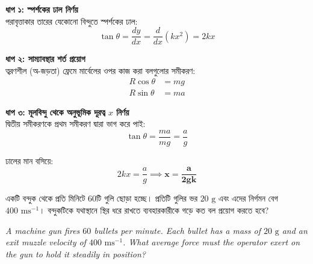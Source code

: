 \documentclass[12pt, a4paper]{article}
\begin{document}
\begin{tcolorbox}[solutionbox={সমাধান (Solution)}]
\noindent
\textbf{ধাপ ১: স্পর্শকের ঢাল নির্ণয়} \\
পরাবৃত্তাকার তারের যেকোনো বিন্দুতে স্পর্শকের ঢাল:
\[\tan\theta = \frac{dy}{dx} = \frac{d}{dx}(kx^2) = 2kx\]

\vspace{0.5em}
\noindent\textbf{ধাপ ২: সাম্যাবস্থার শর্ত প্রয়োগ} \\
ত্বরণশীল (অ-জড়তা) ফ্রেমে মার্বেলের ওপর কাজ করা বলগুলোর সমীকরণ:
\begin{align*}
    R \cos\theta &= mg \\
    R \sin\theta &= ma
\end{align*}

\vspace{0.5em}
\noindent\textbf{ধাপ ৩: মূলবিন্দু থেকে অনুভূমিক দূরত্ব $x$ নির্ণয়} \\
দ্বিতীয় সমীকরণকে প্রথম সমীকরণ দ্বারা ভাগ করে পাই:
\[\tan\theta = \frac{ma}{mg} = \frac{a}{g}\]

ঢালের মান বসিয়ে:
\[2kx = \frac{a}{g} \implies \mathbf{x = \frac{a}{2gk}}\]
\end{tcolorbox}
\begin{tcolorbox}[questionbox={প্রশ্ন (Question) 33}]
    \noindent
    একটি বন্দুক থেকে প্রতি মিনিটে $60$টি গুলি ছোড়া হচ্ছে। প্রতিটি গুলির ভর $20\text{ g}$ এবং এদের নির্গমন বেগ $400\text{ ms}^{-1}$। বন্দুকটিকে যথাস্থানে স্থির ধরে রাখতে ব্যবহারকারীকে গড়ে কত বল প্রয়োগ করতে হবে?
    
    \vspace{0.8em}
    \begin{english}
    \noindent\textit{\color{darkgray}
    A machine gun fires $60$ bullets per minute. Each bullet has a mass of $20\text{ g}$ and an exit muzzle velocity of $400\text{ ms}^{-1}$. What average force must the operator exert on the gun to hold it steadily in position?
    }
    \end{english}
\end{tcolorbox}
\end{document}
